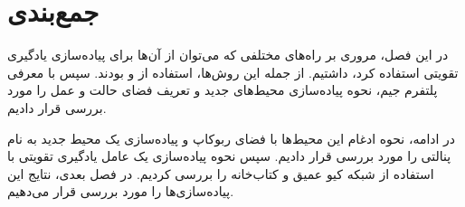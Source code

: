 \section{جمع‌بندی}
در این فصل، مروری بر راه‌های مختلفی که می‌توان از آن‌ها برای پیاده‌سازی یادگیری تقویتی استفاده کرد، داشتیم.
از جمله این روش‌ها، استفاده از  و  بودند.
سپس با معرفی پلتفرم جیم، نحوه پیاده‌سازی محیط‌های جدید و تعریف فضای حالت و عمل را مورد بررسی قرار دادیم.

در ادامه، نحوه ادغام این محیط‌ها با فضای ربوکاپ و پیاده‌سازی یک محیط جدید به نام پنالتی را مورد بررسی قرار دادیم.
سپس نحوه پیاده‌سازی یک عامل یادگیری تقویتی با استفاده از شبکه کیو عمیق و کتاب‌خانه  را بررسی کردیم.
در فصل بعدی، نتایج این پیاده‌سازی‌ها را مورد بررسی قرار می‌دهیم.
